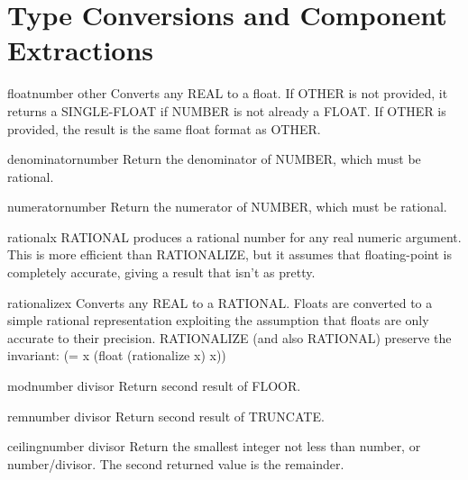 \section{Type Conversions and Component Extractions}
\label{sec:type-conv-comp}

\begin{function}{float}{number \op other}{}{}
  Converts any REAL to a float. If OTHER is not provided, it returns a
  SINGLE-FLOAT if NUMBER is not already a FLOAT. If OTHER is provided, the
  result is the same float format as OTHER.
\end{function}

\begin{function}{denominator}{number}{}{}
  Return the denominator of NUMBER, which must be rational.
\end{function}

\begin{function}{numerator}{number}{}{}
  Return the numerator of NUMBER, which must be rational.
\end{function}

\begin{function}{rational}{x}{}{}
  RATIONAL produces a rational number for any real numeric argument. This is
  more efficient than RATIONALIZE, but it assumes that floating-point is
  completely accurate, giving a result that isn't as pretty.
\end{function}

\begin{function}{rationalize}{x}{}{}
  Converts any REAL to a RATIONAL.  Floats are converted to a simple rational
  representation exploiting the assumption that floats are only accurate to
  their precision.  RATIONALIZE (and also RATIONAL) preserve the invariant:
      (= x (float (rationalize x) x))
\end{function}

\begin{function}{mod}{number divisor}{}{}
  Return second result of FLOOR.
\end{function}

\begin{function}{rem}{number divisor}{}{}
  Return second result of TRUNCATE.
\end{function}

\begin{function}{ceiling}{number \op divisor}{}{}
  Return the smallest integer not less than number, or number/divisor.
  The second returned value is the remainder.
\end{function}

